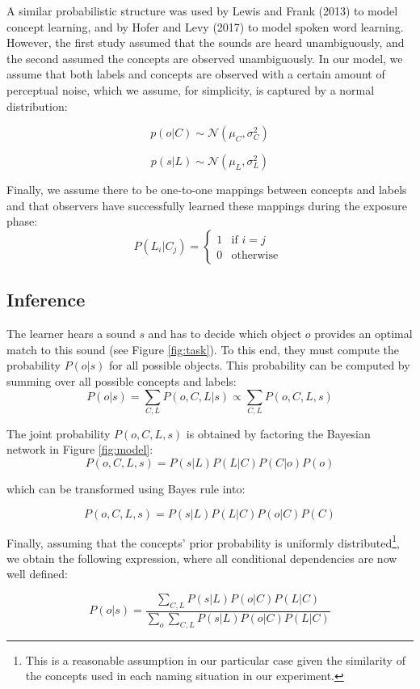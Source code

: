 \documentclass[english,,man,floatsintext]{apa6}
\let\rmarkdownfootnote\footnote%
\def\footnote{\protect\rmarkdownfootnote}
\theoremstyle{definition}
\theoremstyle{definition}
\theoremstyle{definition}
\theoremstyle{remark}
\begin{document}
A similar probabilistic structure was used by Lewis and Frank (2013) to
model concept learning, and by Hofer and Levy (2017) to model spoken
word learning. However, the first study assumed that the sounds are
heard unambiguously, and the second assumed the concepts are observed
unambiguously. In our model, we assume that both labels and concepts are
observed with a certain amount of perceptual noise, which we assume, for
simplicity, is captured by a normal distribution:

\[ p(o | C) \sim  \mathcal{N}(\mu_C, \sigma^2_C) \]

\[ p(s| L) \sim  \mathcal{N}(\mu_L, \sigma^2_L) \]

Finally, we assume there to be one-to-one mappings between concepts and
labels and that observers have successfully learned these mappings
during the exposure phase: \[
P(L_i|C_j) = 
\begin{cases}
  1 & \text{if  }  i=j \\  
  0  & \text{otherwise  }
\end{cases}
\]

\subsection{Inference}\label{inference}

The learner hears a sound \(s\) and has to decide which object \(o\)
provides an optimal match to this sound (see Figure \ref{fig:task}). To
this end, they must compute the probability \(P(o|s)\) for all possible
objects. This probability can be computed by summing over all possible
concepts and labels:
\[P(o|s)=\sum_{C,L} P(o, C, L| s) \propto \sum_{C,L} P(o, C, L, s) \]

The joint probability \(P(o, C, L, s)\) is obtained by factoring the
Bayesian network in Figure \ref{fig:model}:
\[P(o,C,L,s) = P(s|L)P(L|C)P(C|o)P(o) \]

which can be transformed using Bayes rule into:

\[P(o,C,L,s) = P(s|L)P(L|C)P(o|C)P(C) \]

Finally, assuming that the concepts' prior probability is uniformly
distributed\footnote{This is a reasonable assumption in our particular case given the similarity of the concepts used in each naming situation in our experiment.},
we obtain the following expression, where all conditional dependencies
are now well defined:

\[
P(o|s) = \frac{\sum_{C,L} P(s|L)P(o|C)P(L|C)}{\sum_{o} \sum_{C,L} P(s|L)P(o|C)P(L|C)}
\]
\end{document}
